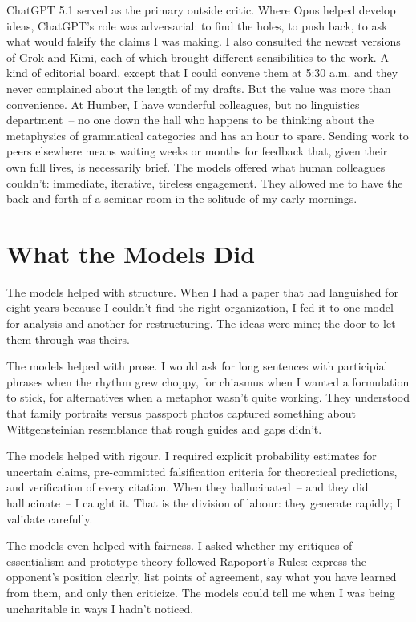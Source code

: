 ChatGPT 5.1 served as the primary outside critic. Where Opus helped develop ideas, ChatGPT's role was adversarial: to find the holes, to push back, to ask what would falsify the claims I was making. I also consulted the newest versions of Grok and Kimi, each of which brought different sensibilities to the work. A kind of editorial board, except that I could convene them at 5:30 a.m. and they never complained about the length of my drafts. But the value was more than convenience. At Humber, I have wonderful colleagues, but no linguistics department~-- no one down the hall who happens to be thinking about the metaphysics of grammatical categories and has an hour to spare. Sending work to peers elsewhere means waiting weeks or months for feedback that, given their own full lives, is necessarily brief. The models offered what human colleagues couldn't: immediate, iterative, tireless engagement. They allowed me to have the back-and-forth of a seminar room in the solitude of my early mornings.

\section*{What the Models Did}

The models helped with structure. When I had a paper that had languished for eight years because I couldn't find the right organization, I fed it to one model for analysis and another for restructuring. The ideas were mine; the door to let them through was theirs.

The models helped with prose. I would ask for long sentences with participial phrases when the rhythm grew choppy, for chiasmus when I wanted a formulation to stick, for alternatives when a metaphor wasn't quite working. They understood that family portraits versus passport photos captured something about Wittgensteinian resemblance that rough guides and gaps didn't.

The models helped with rigour. I required explicit probability estimates for uncertain claims, pre-committed falsification criteria for theoretical predictions, and verification of every citation. When they hallucinated~-- and they did hallucinate~-- I caught it. That is the division of labour: they generate rapidly; I validate carefully.

The models even helped with fairness. I asked whether my critiques of essentialism and prototype theory followed Rapoport's Rules: express the opponent's position clearly, list points of agreement, say what you have learned from them, and only then criticize. The models could tell me when I was being uncharitable in ways I hadn't noticed.

